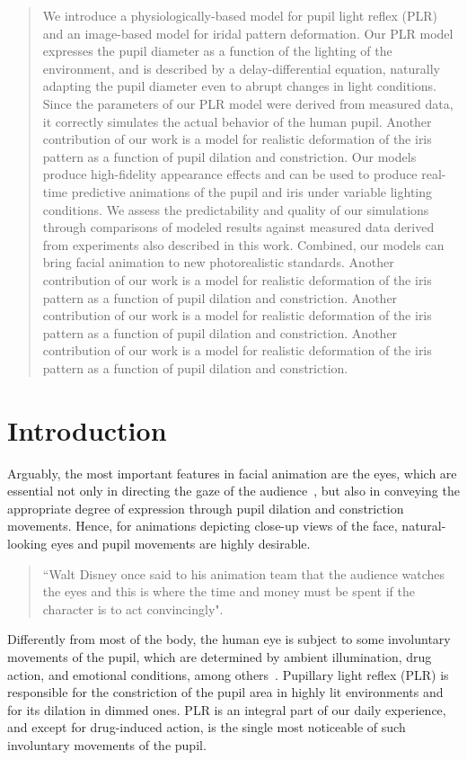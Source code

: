 \documentclass{acmtog} %
\begin{document}
\begin{abstract}
We introduce a physiologically-based model for pupil light reflex (PLR)
and an image-based model for iridal pattern deformation. Our PLR model
expresses the pupil diameter as a function of the lighting of the
environment, and is described by a delay-differential equation,
naturally adapting the pupil diameter even to abrupt changes in light
conditions. Since the parameters of our PLR model were derived from
measured data, it correctly simulates the actual behavior of the human
pupil. Another contribution of our work is a model for realistic
deformation of the iris pattern as a function of pupil dilation and
constriction. Our models produce high-fidelity appearance effects and
can be used to produce real-time predictive animations of the pupil and
iris under variable lighting conditions. We assess the predictability
and quality of our simulations through comparisons of modeled results
against measured data derived from experiments also described in this
work. Combined, our models can bring facial animation to new
photorealistic standards. Another contribution of our work is a model
for realistic deformation of the iris pattern as a function of pupil
dilation and constriction. Another contribution of our work is a model
for realistic deformation of the iris pattern as a function of pupil
dilation and constriction. Another contribution of our work is a model
for realistic deformation of the iris pattern as a function of pupil
dilation and constriction.
\end{abstract}

\section{Introduction}
Arguably, the most important features in facial animation are the eyes,
which are essential not only in directing the gaze of the
audience~\cite{BLR-2007}, but also in conveying the appropriate degree
of expression through pupil dilation and constriction movements. Hence,
for animations depicting close-up views of the face, natural-looking
eyes and pupil movements are highly desirable.
 
\begin{quote}
``Walt Disney once said to his animation team that the audience watches
the eyes and this is where the time and money must be spent if the
character is to act convincingly".
\end{quote}

Differently from most of the body, the human eye is subject to some
involuntary movements of the pupil, which are determined by ambient
illumination, drug action, and emotional conditions, among
others~\cite{BDDG-03}. Pupillary light reflex (PLR) is responsible for
the constriction of the pupil area in highly lit environments and for
its dilation in dimmed ones. PLR is an integral part of our daily
experience, and except for drug-induced action, is the single most
noticeable of such involuntary movements of the pupil.
\end{document}
